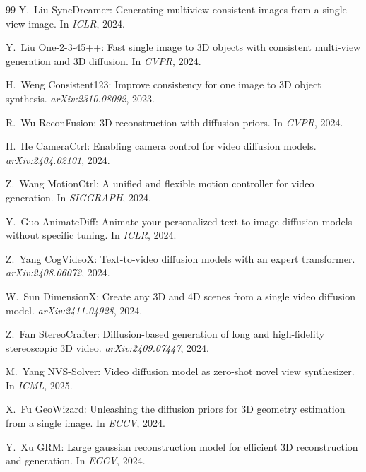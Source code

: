 \begin{thebibliography}{99}
Y.~Liu \etal
{SyncDreamer}: Generating multiview-consistent images from a single-view image.
In \emph{ICLR}, 2024.


Y.~Liu \etal
One-2-3-45++: Fast single image to 3{D} objects with consistent multi-view
generation and 3{D} diffusion.
In \emph{CVPR}, 2024.


H.~Weng \etal
Consistent123: Improve consistency for one image to 3{D} object synthesis.
\emph{arXiv:2310.08092}, 2023.


R.~Wu \etal
{ReconFusion}: 3{D} reconstruction with diffusion priors.
In \emph{CVPR}, 2024.


H.~He \etal
{CameraCtrl}: Enabling camera control for video diffusion models.
\emph{arXiv:2404.02101}, 2024.


Z.~Wang \etal
{MotionCtrl}: A unified and flexible motion controller for video generation.
In \emph{SIGGRAPH}, 2024.


Y.~Guo \etal
{AnimateDiff}: Animate your personalized text-to-image diffusion models without
specific tuning.
In \emph{ICLR}, 2024.


Z.~Yang \etal
{CogVideoX}: Text-to-video diffusion models with an expert transformer.
\emph{arXiv:2408.06072}, 2024.


W.~Sun \etal
{DimensionX}: Create any 3{D} and 4{D} scenes from a single video diffusion
model.
\emph{arXiv:2411.04928}, 2024.


Z.~Fan \etal
{StereoCrafter}: Diffusion-based generation of long and high-fidelity
stereoscopic 3{D} video.
\emph{arXiv:2409.07447}, 2024.


M.~Yang \etal
{NVS-Solver}: Video diffusion model as zero-shot novel view synthesizer.
In \emph{ICML}, 2025.


X.~Fu \etal
{GeoWizard}: Unleashing the diffusion priors for 3{D} geometry estimation
from a single image.
In \emph{ECCV}, 2024.


Y.~Xu \etal
{GRM}: Large gaussian reconstruction model for efficient 3{D} reconstruction
and generation.
In \emph{ECCV}, 2024.



\end{thebibliography}
